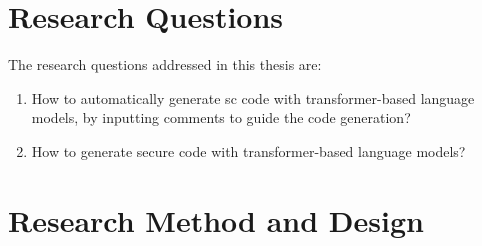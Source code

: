 \section{Research Questions}
\label{sec:research-questions}
The research questions addressed in this thesis are:

\begin{enumerate}[label=\textbf{RQ\arabic*.}, leftmargin=1.5cm]
    \item How to automatically generate \acrlong{sc} code with transformer-based language models, by inputting comments to guide the code generation?
    \item How to generate secure code with transformer-based language models?
\end{enumerate}

\section{Research Method and Design}
\label{sec:research-method-and-design}


